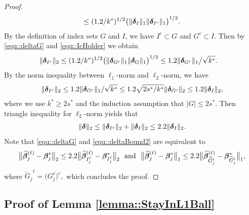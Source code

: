 \documentclass[twoside,11pt]{article}
\newcommand*{\hbbeta}{\hat{\bbeta}}
\newcommand*{\bbetas}{\bbeta^*}
\newcommand*{\hbbetas}{\hat{\bbeta}_{j}}
\newcommand*{\bbetass}{\bbeta^*_{j}}
\begin{document}
\begin{proof}
\begin{align}
\leq (1.2/k^*)^{1/2} \bigl(\|\bm{\delta} _{I}\|_1 \|\bm{\delta} _{I^c}\|_1\bigr)^{1/2}.
\end{align}
By the definition of index sets $G$ and $I$, we have $I^c \subset G$ and $G^c \subset I.$
Then by \eqref{equ::deltaG} and \eqref{equ::IcHolder} we obtain
\begin{align*}
\|\bm{\delta}_{I^c} \|_2&\leq (1.2/k^*)^{1/2}\bigl (\|\bm{\delta} _{G^c}\|_1 \|\bm{\delta} _{G}\|_1\bigr)^{1/2} 
\leq 1.2\|\bm{\delta} _{G^c}\|_1\big/ \sqrt{k^*}.
\end{align*}
By  the norm inequality between $\ell_1$-norm and $\ell_2$-norm, we have 
\begin{align*}
\|\bm{\delta}_{I^c} \|_2 \leq 1.2\|\bm{\delta} _{G^c}\|_1/ \sqrt{k^*} \leq  1.2\sqrt{2s^*/k^*}\|\bm{\delta} _{G^c}\|_2 \leq 1.2 \|\bm{\delta}_I\|_2,
\end{align*}
where we use $k^*\geq 2s^*$ and  the induction assumption that $|G|\leq 2s^*.$
Then triangle inequality for $\ell_2$-norm yields that 
\begin{align}\label{equ::deltaBound2}
\|\bm{\delta} \| _2 \leq \|\bm{\delta}_{I^c}\|_2 + \|\bm{\delta}_I\|_2\leq 2.2\|\bm{\delta}_I\|_2 .
\end{align}
 Note that \eqref{equ::deltaG} and \eqref{equ::deltaBound2} are equivalent to
 \begin{align*}
 \bigl \| \hbbetas^{(\ell)} - \bbetass\bigr \|_2 \leq  2.2\bigl \|  \hbbeta^{(\ell)}_{I_j^{\ell}} -  \bbetas _{I_j^{\ell}}\bigr \|_2~~\text{and}~~
 \bigl \| \hbbetas^{(\ell)} - \bbetass\bigr \|_1 \leq 2.2\bigl \| {\hbbeta}_{\tilde G_j^\ell}^{(\ell)} - \bbetas_{{\tilde G_j}^\ell}\bigr \|_1,
 \end{align*}
 where ${\tilde G_j}^\ell = \bigl( G_j^\ell\bigr)^c,$ which concludes the proof.
\end{proof}
  
  
\subsection{Proof of Lemma \ref{lemma::StayInL1Ball}}\label{proof::lemma::StayInL1Ball}
\end{document}
